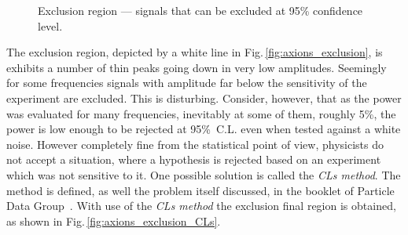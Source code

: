 \begin{figure}[bth]
  \myfloatalign
  \quad
  \caption{Exclusion region --- signals that can be excluded at 95\% confidence level.}
  \label{fig:axions_exclusions}
\end{figure}

The exclusion region, depicted by a white line in Fig.\,\ref{fig:axions_exclusion}, is exhibits a number of thin peaks going down in very low amplitudes. Seemingly for some frequencies signals with amplitude far below the sensitivity of the experiment are excluded. This is disturbing. Consider, however, that as the power was evaluated for many frequencies, inevitably at some of them, roughly 5\%, the power is low enough to be rejected at 95\%~C.L. even when tested against a white noise. However completely fine from the statistical point of view, physicists do not accept a situation, where a hypothesis is rejected based on an experiment which was not sensitive to it. One possible solution is called the \emph{CLs method}. The method is defined, as well the problem itself discussed, in the booklet of Particle Data Group~\citep{Group2014}. With use of the \emph{CLs method} the exclusion final region is obtained, as shown in Fig.\,\ref{fig:axions_exclusion_CLs}.
